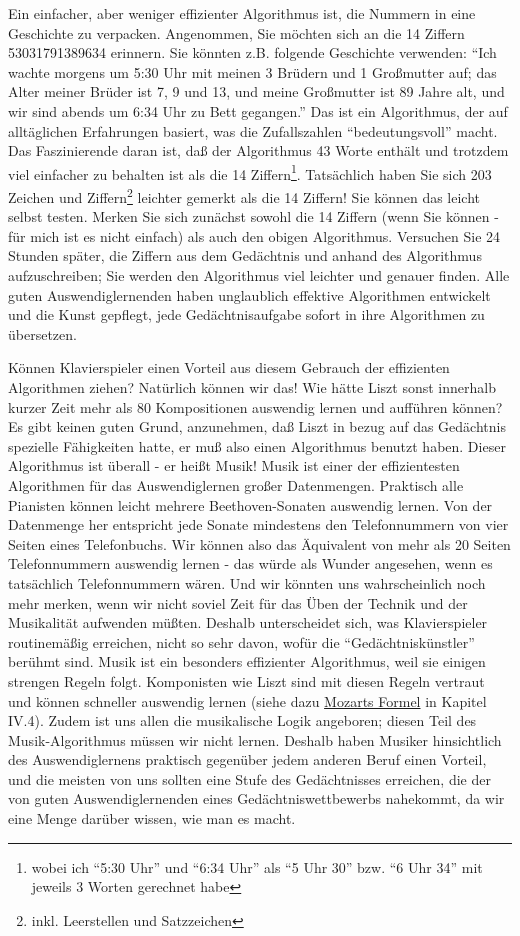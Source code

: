 Ein einfacher, aber weniger effizienter Algorithmus ist, die Nummern in eine Geschichte zu verpacken.
Angenommen, Sie möchten sich an die 14 Ziffern 53031791389634 erinnern.
Sie könnten z.B. folgende Geschichte verwenden: \enquote{Ich wachte morgens um 5:30 Uhr mit meinen 3 Brüdern und 1 Großmutter auf; das Alter meiner Brüder ist 7, 9 und 13, und meine Großmutter ist 89 Jahre alt, und wir sind abends um 6:34 Uhr zu Bett gegangen.}
Das ist ein Algorithmus, der auf alltäglichen Erfahrungen basiert, was die Zufallszahlen \enquote{bedeutungsvoll} macht.
Das Faszinierende daran ist, daß der Algorithmus 43 Worte enthält und trotzdem viel einfacher zu behalten ist als die 14 Ziffern\footnote{wobei ich \enquote{5:30 Uhr} und \enquote{6:34 Uhr} als \enquote{5 Uhr 30} bzw. \enquote{6 Uhr 34} mit jeweils 3 Worten gerechnet habe}.
Tatsächlich haben Sie sich 203 Zeichen und Ziffern\footnote{inkl. Leerstellen und Satzzeichen} leichter gemerkt als die 14 Ziffern!
Sie können das leicht selbst testen.
Merken Sie sich zunächst sowohl die 14 Ziffern (wenn Sie können - für mich ist es nicht einfach) als auch den obigen Algorithmus.
Versuchen Sie 24 Stunden später, die Ziffern aus dem Gedächtnis und anhand des Algorithmus aufzuschreiben; Sie werden den Algorithmus viel leichter und genauer finden.
Alle guten Auswendiglernenden haben unglaublich effektive Algorithmen entwickelt und die Kunst gepflegt, jede Gedächtnisaufgabe sofort in ihre Algorithmen zu übersetzen.

Können Klavierspieler einen Vorteil aus diesem Gebrauch der effizienten Algorithmen ziehen?
Natürlich können wir das!
Wie hätte Liszt sonst innerhalb kurzer Zeit mehr als 80 Kompositionen auswendig lernen und aufführen können?
Es gibt keinen guten Grund, anzunehmen, daß Liszt in bezug auf das Gedächtnis spezielle Fähigkeiten hatte, er muß also einen Algorithmus benutzt haben.
Dieser Algorithmus ist überall - er heißt Musik!
Musik ist einer der effizientesten Algorithmen für das Auswendiglernen großer Datenmengen.
Praktisch alle Pianisten können leicht mehrere Beethoven-Sonaten auswendig lernen.
Von der Datenmenge her entspricht jede Sonate mindestens den Telefonnummern von vier Seiten eines Telefonbuchs.
Wir können also das Äquivalent von mehr als 20 Seiten Telefonnummern auswendig lernen - das würde als Wunder angesehen, wenn es tatsächlich Telefonnummern wären.
Und wir könnten uns wahrscheinlich noch mehr merken, wenn wir nicht soviel Zeit für das Üben der Technik und der Musikalität aufwenden müßten.
Deshalb unterscheidet sich, was Klavierspieler routinemäßig erreichen, nicht so sehr davon, wofür die \enquote{Gedächtniskünstler} berühmt sind.
Musik ist ein besonders effizienter Algorithmus, weil sie einigen strengen Regeln folgt.
Komponisten wie Liszt sind mit diesen Regeln vertraut und können schneller auswendig lernen (siehe dazu \hyperref[c1iv4]{Mozarts Formel} in Kapitel IV.4).
Zudem ist uns allen die musikalische Logik angeboren; diesen Teil des Musik-Algorithmus müssen wir nicht lernen.
Deshalb haben Musiker hinsichtlich des Auswendiglernens praktisch gegenüber jedem anderen Beruf einen Vorteil, und die meisten von uns sollten eine Stufe des Gedächtnisses erreichen, die der von guten Auswendiglernenden eines Gedächtniswettbewerbs nahekommt, da wir eine Menge darüber wissen, wie man es macht.

